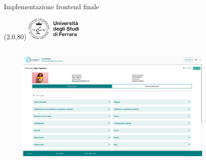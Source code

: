 \documentclass[11pt,xcolor={dvipsnames}]{beamer} %
\newcommand{\MyLogo}{%
\begin{textblock}{14}(2.0,80)
 \includegraphics[height=1.15cm, angle=0]{logo}
\end{textblock}
}
\begin{document}
\begin{frame}{Implementazione frontend finale}
	\transglitter
	\MyLogo
	\begin{columns}[T] %
		\begin{column}{0.7\textwidth}
			\begin{figure}
				\centering
				\includegraphics[width=\textwidth]{../images/permission-management-desktop.png}
			\end{figure}
		\end{column}
		\begin{column}{0.2\textwidth}
			\begin{figure}
				\centering

\end{figure}
\end{column}
\end{columns}
\end{frame}
\end{document}
